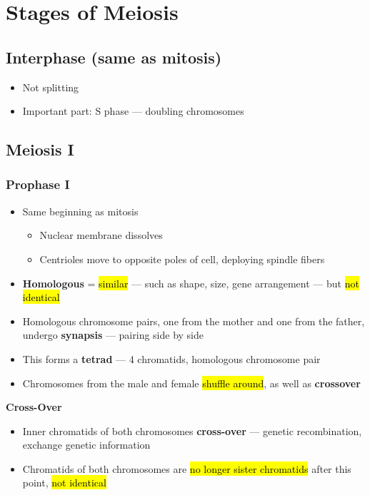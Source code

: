 \documentclass[a4paper,12pt]{article}
\begin{document}
\section{Stages of Meiosis}

\subsection{Interphase (same as mitosis)}
\begin{itemize}
    \item{Not splitting}
    \item{Important part: S phase --- doubling chromosomes}
\end{itemize}

\subsection{Meiosis I}

\subsubsection{Prophase I}
\begin{itemize}
    \item{Same beginning as mitosis
          \begin{itemize}
              \item{Nuclear membrane dissolves}
              \item{Centrioles move to opposite poles of cell, deploying spindle fibers}
          \end{itemize}
         }
     \item{\textbf{Homologous} = \hl{similar} --- such as shape, size, gene arrangement --- but \hl{not identical}}
     \item{Homologous chromosome pairs, one from the mother and one from the father, undergo \textbf{synapsis} --- pairing side by side}
     \item{This forms a \textbf{tetrad} --- 4 chromatids, homologous chromosome pair}
     \item{Chromosomes from the male and female \hl{shuffle around}, as well as \textbf{crossover}}
\end{itemize}
\textbf{Cross-Over}
\begin{itemize}
     \item{Inner chromatids of both chromosomes \textbf{cross-over} --- genetic recombination, exchange genetic information}
     \item{Chromatids of both chromosomes are \hl{no longer sister chromatids} after this point, \hl{not identical}}
\end{itemize}
\end{document}
